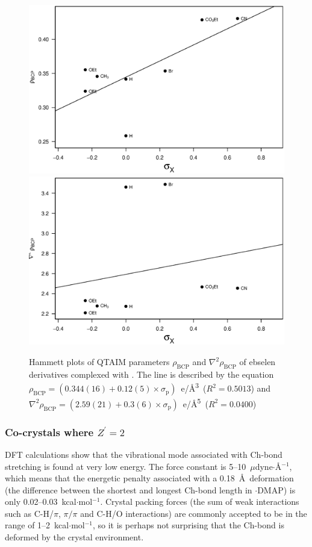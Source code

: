 \begin{refsection}
\begin{figure}
  \centering
  \includegraphics[width=0.45\linewidth]{Figures/hammett-rho-morph.eps}
  \includegraphics[width=0.45\linewidth]{Figures/hammett-lapl-morph.eps}
  \caption[Hammett plots of QTAIM parameters $\rho_\text{BCP}$ and $\nabla^2\rho_{\text{BCP}}$ of ebselen derivatives complexed with .]{Hammett plots of QTAIM parameters $\rho_\text{BCP}$ and $\nabla^2\rho_{\text{BCP}}$ of ebselen derivatives complexed with . The line is described by the equation $\rho_{\text{BCP}} = (0.344(16) + 0.12(5) \times \sigma_\text{p})$~e/\AA\textsuperscript{3}~($R^2=0.5013$) and $\nabla^2\rho_{\text{BCP}} = (2.59(21) + 0.3(6) \times \sigma_\text{p})$~e/\AA\textsuperscript{5}~($R^2=0.0400$)}\label{fig:hammett-qtaim-morph}
\end{figure}

\subsubsection{Co-crystals where \texorpdfstring{$Z^\prime=2$}{Z'=2}}\label{sec:z2}
DFT calculations show that the vibrational mode associated with Ch-bond stretching is found at very low energy.
The force constant is 5--10~$\mu$dyne$ \cdot $\AA$^{-1}$, which means that the energetic penalty associated with a 0.18~\AA\ deformation (the difference between the shortest and longest Ch-bond length in $ \cdot $DMAP) is only 0.02--0.03~kcal$ \cdot $mol$^{-1}$.
Crystal packing forces (the sum of weak interactions such as C-H/$\pi$, $\pi /\pi$ and C-H/O interactions) are commonly accepted to be in the range of 1--2~kcal$ \cdot $mol$^{-1}$, so it is perhaps not surprising that the Ch-bond is deformed by the crystal environment.\autocite{Dunitz1988}


\end{refsection}
